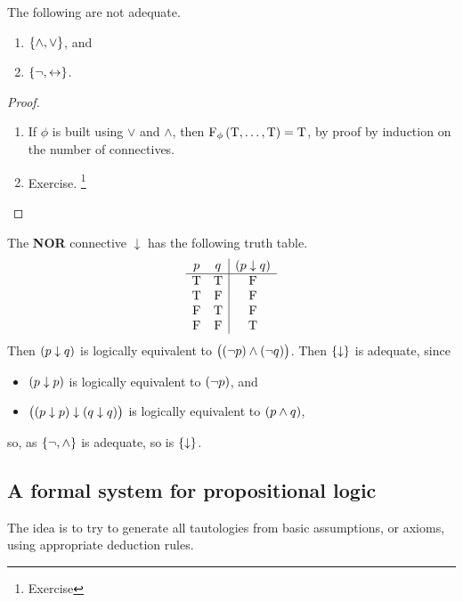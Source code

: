 
\begin{example}
The following are not adequate.
\begin{enumerate}
\item $ \cbr{\land, \lor} $, and
\item $ \cbr{\neg, \leftrightarrow} $.
\end{enumerate}
\end{example}

\begin{proof}
\hfill
\begin{enumerate}
\item If $ \phi $ is built using $ \lor $ and $ \land $, then $ \F_\phi\br{\T, \dots, \T} = \T $, by proof by induction on the number of connectives.
\item Exercise. \footnote{Exercise}
\end{enumerate}
\end{proof}

\begin{example}
The \textbf{NOR} connective $ \downarrow $ has the following truth table.
$$
\begin{array}{cc|c}
p & q & \br{p \downarrow q} \\
\hline
\T & \T & \F \\
\T & \F & \F \\
\F & \T & \F \\
\F & \F & \T
\end{array}
$$
Then $ \br{p \downarrow q} $ is logically equivalent to $ \andb{\notb{p}}{\notb{q}} $. Then $ \cbr{\downarrow} $ is adequate, since
\begin{itemize}
\item $ \br{p \downarrow p} $ is logically equivalent to $ \notb{p} $, and
\item $ \br{\br{p \downarrow p} \downarrow \br{q \downarrow q}} $ is logically equivalent to $ \andb{p}{q} $,
\end{itemize}
so, as $ \cbr{\neg, \land} $ is adequate, so is $ \cbr{\downarrow} $.
\end{example}

\subsection{A formal system for propositional logic}

The idea is to try to generate all tautologies from basic assumptions, or axioms, using appropriate deduction rules.

